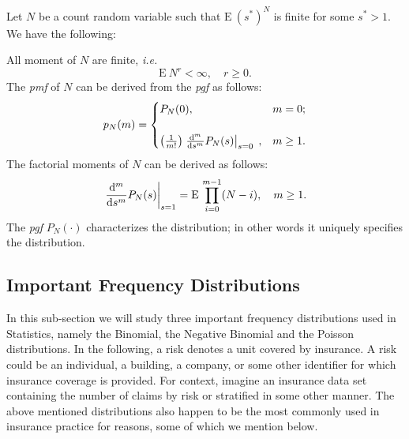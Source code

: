 \documentclass[]{book}
\theoremstyle{definition}
\theoremstyle{definition}
\theoremstyle{definition}
\theoremstyle{remark}
\let\BeginKnitrBlock\begin \let\EndKnitrBlock\end
\begin{document}
\BeginKnitrBlock{theorem}
\protect\hypertarget{thm:pgfthm}{}{\label{thm:pgfthm} }Let \(N\) be a count
random variable such that \(\mathrm{E}~{(s^{\ast})^N}\) is finite for
some \(s^\ast>1\). We have the following:

All moment of \(N\) are finite, \emph{i.e.} \[
\mathrm{E}~{N^r}<\infty, \quad r\geq 0.
\] The \emph{pmf} of \(N\) can be derived from the \emph{pgf} as
follows: \[
p_N(m)=\begin{cases} 
P_N(0), &m=0;\cr
&\cr
\left(\frac{1}{m!}\right) \left.\frac{{\rm d}^m}{{\rm d}s^m} P_N(s)\right\vert_{s=0}\;, &m\geq 1.\cr
\end{cases}
\] The factorial moments of \(N\) can be derived as follows: \[
\left.\frac{{\rm d}^m}{{\rm d}s^m} P_N(s)\right\vert_{s=1}=\mathrm{E}~{\prod\limits_{i=0}^{m-1} (N-i)}, \quad m\geq 1.
\] The \emph{pgf} \(P_N(\cdot)\) characterizes the distribution; in
other words it uniquely specifies the distribution.
\EndKnitrBlock{theorem}

\subsection{Important Frequency
Distributions}\label{S:important-frequency-distributions}

In this sub-section we will study three important frequency
distributions used in Statistics, namely the Binomial, the Negative
Binomial and the Poisson distributions. In the following, a risk denotes
a unit covered by insurance. A risk could be an individual, a building,
a company, or some other identifier for which insurance coverage is
provided. For context, imagine an insurance data set containing the
number of claims by risk or stratified in some other manner. The above
mentioned distributions also happen to be the most commonly used in
insurance practice for reasons, some of which we mention below.
\end{document}
